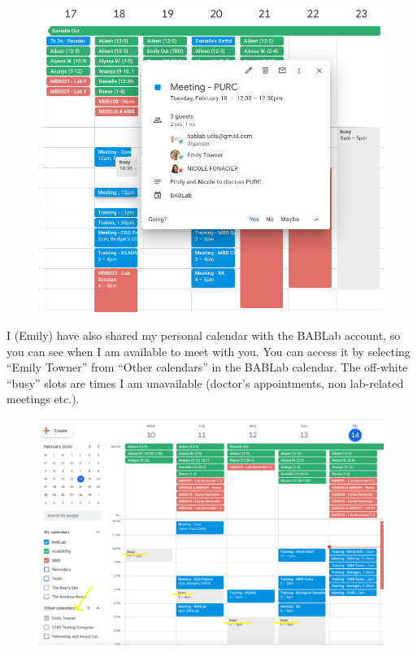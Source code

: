 \documentclass[]{book}
\begin{document}
\begin{figure}
\centering
\includegraphics{images/lab_protocols/trainee_tuesdays_thursdays/1.png}
\caption{}
\end{figure}

I (Emily) have also shared my personal calendar with the BABLab account,
so you can see when I am available to meet with you. You can access it
by selecting ``Emily Towner'' from ``Other calendars'' in the BABLab
calendar. The off-white ``busy'' slots are times I am unavailable
(doctor's appointments, non lab-related meetings etc.).

\begin{figure}
\centering
\includegraphics{images/lab_protocols/trainee_tuesdays_thursdays/2.png}
\caption{}
\end{figure}
\end{document}
